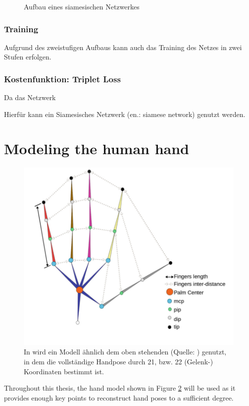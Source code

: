 	 
	 
	 \begin{figure}
	 	\centering
	 	
	 	\caption{Aufbau eines siamesischen Netzwerkes}
	 	\label{fig:siamesenetwork}
	 \end{figure}
	 
	 
	 \subsubsection{Training}
	 Aufgrund des zweistufigen Aufbaus kann auch das Training des Netzes in zwei Stufen erfolgen.
	 
	 \subsubsection{Kostenfunktion: Triplet Loss}
	 Da das Netzwerk 
	 

	
	Hierfür kann ein Siamesisches Netzwerk (en.: siamese network) genutzt werden. 
	
\section { Modeling the human hand }
	
	\begin{figure}
		\centering
		\includegraphics[width=0.7\linewidth]{Ressourcen/malik2018_hand_model}
		\caption[Handmodell nach \cite{Malik2018b}]{In \cite{Malik2018b} wird ein Modell ähnlich dem oben stehenden (Quelle: \cite{Malik2018b}) genutzt, in dem die vollständige Handpose durch 21, bzw. 22 (Gelenk-) Koordinaten bestimmt ist.}
		\label{fig:malik2018handmodel}
	\end{figure}
	Throughout this thesis, the hand model shown in Figure \ref{fig:malik2018handmodel} will be used as it provides enough key points to reconstruct hand poses to a sufficient degree.
	
